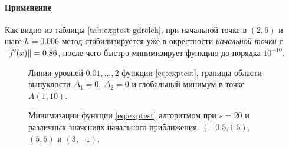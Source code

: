 \paragraph{Применение \gdrelch{}}

Как видно из таблицы \ref{tab:exptest-gdrelch}, при начальной точке в
$(2,6)$ и шаге $h=0.006$ метод \gdrelch{} стабилизируется уже в
окрестности \emph{начальной точки} с $\left \lVert{f'(x)}\right \rVert = 0.86$, после чего
быстро минимизирует функцию до порядка $10^{-10}$.

\begin{figure}[thb]
  \centering
  \caption[Экспоненциальная функция]{Линии уровней $0.01,\dotsc,2$
    функции \eqref{eq:exptest}, границы области выпуклости
    $\Delta_1=0$, $\Delta_2=0$ и глобальный минимум в точке $A(1,
    10)$.}
  \label{fig:exptest-convexity}
\end{figure}

\begin{figure}[thb]
  \centering
  \caption[\relch{} на экспоненциальной функции]{Минимизации функции
    \eqref{eq:exptest} алгоритмом \relch{} при $s=20$ и различных
    значениях начального приближения: $(-0.5,1.5)$, $(5,5)$ и
    $(3,-1)$.}
  \label{fig:exptest-relch}
\end{figure}

